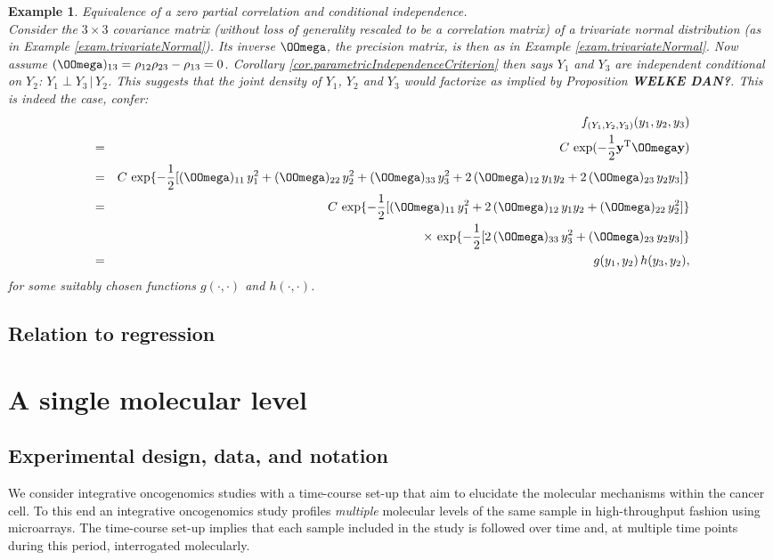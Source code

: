 \documentclass[a4paper]{article}
\theoremstyle{myexamplestyle}
\newtheorem{example}{Example}
\def\reminder#1{\marginpar{\rule[0pt]{1mm}{11pt}}\textbf{#1}}
\begin{document}
\begin{example}
\textit{Equivalence of a zero partial correlation and conditional independence.}
\\
Consider the $3 \times 3$ covariance matrix (without loss of generality rescaled to be a correlation matrix) of a trivariate normal distribution (as in Example \ref{exam.trivariateNormal}).
Its inverse $\OOmega$, the precision matrix, is then as in Example \ref{exam.trivariateNormal}. Now assume $(\OOmega)_{13} = \rho_{12} \rho_{23} - \rho_{13} = 0$. Corollary \ref{cor.parametricIndependenceCriterion} then says $Y_1$ and $Y_3$ are independent conditional on $Y_2$: $Y_1 \perp Y_3 \, | \, Y_2$. This suggests that the joint density of $Y_1$, $Y_2$ and $Y_3$ would factorize as implied by Proposition \reminder{WELKE DAN?}. This is indeed the case, confer:
\begin{eqnarray*}
& & \hspace{-1.5cm} f_{(Y_1, Y_2, Y_3)}(y_1, y_2, y_3) 
\\
& = & C \, \exp( - \frac{1}{2} \mathbf{y}^{\mathrm{T}} \OOmega \mathbf{y} )
\\
& = & C \, \exp \{ - \frac{1}{2} [ (\OOmega)_{11} \, y_1^2  + (\OOmega)_{22} \, y_2^2 + (\OOmega)_{33} \, y_3^2 + 2 \, (\OOmega)_{12} \, y_1 y_2 + 2 \, (\OOmega)_{23} \, y_2 y_3]  \}
\\
& = & C \, \exp \{ - \frac{1}{2} [ (\OOmega)_{11} \, y_1^2  + 2 \, (\OOmega)_{12} \, y_1 y_2 + (\OOmega)_{22} \, y_2^2 ] \} 
\\
& & \times \, \exp \{ - \frac{1}{2} [  2 \, (\OOmega)_{33} \, y_3^2 + (\OOmega)_{23} \, y_2 y_3]  \}
\\
& = & g(y_1, y_2) \, h(y_3, y_2),
\end{eqnarray*}
for some suitably chosen functions $g(\cdot, \cdot)$ and $h(\cdot, \cdot)$. 
\end{example}


\subsection{Relation to regression}





\newpage
\section{A single molecular level}
\subsection{Experimental design, data, and notation}
We consider integrative oncogenomics studies with a time-course set-up that aim to elucidate the molecular mechanisms within the cancer cell. To this end an integrative oncogenomics study profiles {\it multiple} molecular levels of the same sample in high-throughput fashion using microarrays. The time-course set-up implies that each sample included in the study is followed over time and, at multiple time points during this period, interrogated molecularly.
\end{document}

